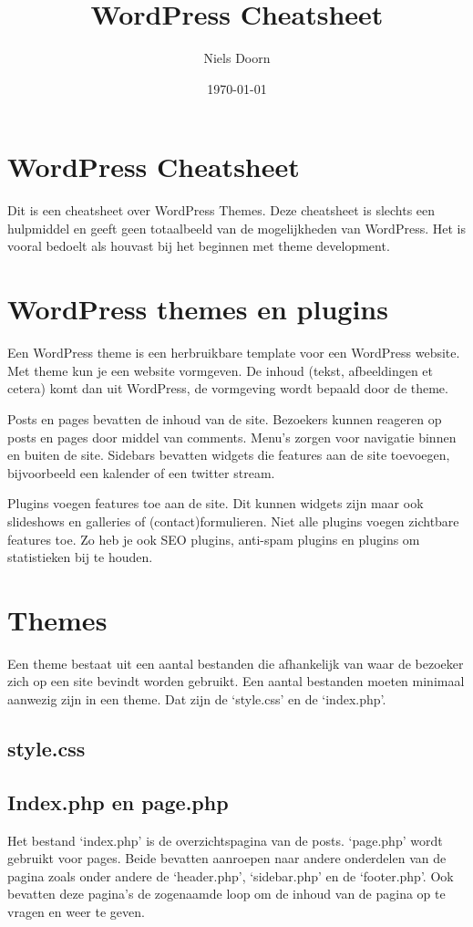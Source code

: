 \documentclass[8pt,pagesize,footinclude=false,headinclude=false]{scrartcl}
\title{WordPress Cheatsheet}
\author{Niels Doorn}
\date{\today}
\begin{document}
\ifpdf
{}
\else
{}
\fi

\begin{multicols*}{2}

\section*{WordPress Cheatsheet}
Dit is een cheatsheet over WordPress Themes. Deze cheatsheet is slechts een hulpmiddel en geeft geen totaalbeeld van de mogelijkheden van WordPress. Het is vooral bedoelt als houvast bij het beginnen met theme development.

\section*{WordPress themes en plugins}
Een WordPress theme is een herbruikbare template voor een WordPress website. Met theme kun je een website vormgeven. De inhoud (tekst, afbeeldingen et cetera) komt dan uit WordPress, de vormgeving wordt bepaald door de theme.

Posts en pages bevatten de inhoud van de site. Bezoekers kunnen reageren op posts en pages door middel van comments. Menu's zorgen voor navigatie binnen en buiten de site. Sidebars bevatten widgets die features aan de site toevoegen, bijvoorbeeld een kalender of een twitter stream.

Plugins voegen features toe aan de site. Dit kunnen widgets zijn maar ook slideshows en galleries of (contact)formulieren. Niet alle plugins voegen zichtbare features toe. Zo heb je ook SEO plugins, anti-spam plugins en plugins om statistieken bij te houden.

\section*{Themes}
Een theme bestaat uit een aantal bestanden die afhankelijk van waar de bezoeker zich op een site bevindt worden gebruikt. Een aantal bestanden moeten minimaal aanwezig zijn in een theme. Dat zijn de `style.css' en de `index.php'.

\subsection*{style.css}


\subsection*{Index.php en page.php}
Het bestand `index.php' is de overzichtspagina van de posts. `page.php' wordt gebruikt voor pages. Beide bevatten aanroepen naar andere onderdelen van de pagina zoals onder andere de `header.php', `sidebar.php' en de `footer.php'. Ook bevatten deze pagina's de zogenaamde loop om de inhoud van de pagina op te vragen en weer te geven.


\end{multicols*}
\end{document}

